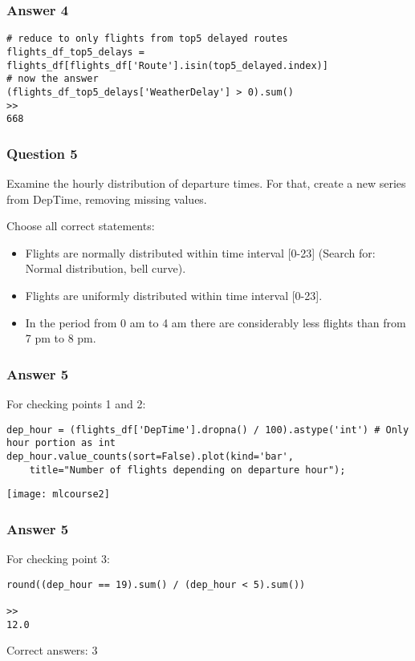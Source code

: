 \begin{frame}[fragile]\frametitle{Answer 4}
\begin{lstlisting}
# reduce to only flights from top5 delayed routes
flights_df_top5_delays = flights_df[flights_df['Route'].isin(top5_delayed.index)]
# now the answer
(flights_df_top5_delays['WeatherDelay'] > 0).sum()
>>
668
\end{lstlisting}

\end{frame}

\begin{frame}[fragile]\frametitle{Question 5}
Examine the hourly distribution of departure times. For that, create a new series from DepTime, removing missing values.

Choose all correct statements:
\begin{itemize}
\item Flights are normally distributed within time interval [0-23] (Search for: Normal distribution, bell curve).
\item Flights are uniformly distributed within time interval [0-23].
\item In the period from 0 am to 4 am there are considerably less flights than from 7 pm to 8 pm.
\end{itemize}

\end{frame}

\begin{frame}[fragile]\frametitle{Answer 5}
For checking points 1 and 2:
\begin{lstlisting}
dep_hour = (flights_df['DepTime'].dropna() / 100).astype('int') # Only hour portion as int
dep_hour.value_counts(sort=False).plot(kind='bar', 
    title="Number of flights depending on departure hour");
\end{lstlisting}
\begin{center}
\texttt{[image: mlcourse2]}
\end{center}
\end{frame}

\begin{frame}[fragile]\frametitle{Answer 5}
For checking point 3:
\begin{lstlisting}
round((dep_hour == 19).sum() / (dep_hour < 5).sum())

>>
12.0
\end{lstlisting}
Correct answers: 3
\end{frame}

